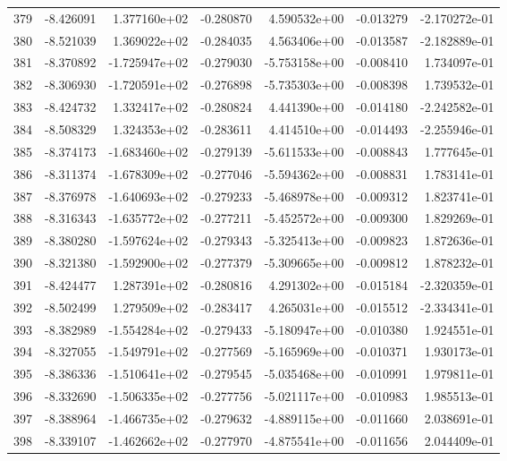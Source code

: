\begin{tabular}{rrrrrrr}
 379 &  -8.426091 &  1.377160e+02 & -0.280870 &  4.590532e+00 &   -0.013279 & -2.170272e-01 \\
 380 &  -8.521039 &  1.369022e+02 & -0.284035 &  4.563406e+00 &   -0.013587 & -2.182889e-01 \\
 381 &  -8.370892 & -1.725947e+02 & -0.279030 & -5.753158e+00 &   -0.008410 &  1.734097e-01 \\
 382 &  -8.306930 & -1.720591e+02 & -0.276898 & -5.735303e+00 &   -0.008398 &  1.739532e-01 \\
 383 &  -8.424732 &  1.332417e+02 & -0.280824 &  4.441390e+00 &   -0.014180 & -2.242582e-01 \\
 384 &  -8.508329 &  1.324353e+02 & -0.283611 &  4.414510e+00 &   -0.014493 & -2.255946e-01 \\
 385 &  -8.374173 & -1.683460e+02 & -0.279139 & -5.611533e+00 &   -0.008843 &  1.777645e-01 \\
 386 &  -8.311374 & -1.678309e+02 & -0.277046 & -5.594362e+00 &   -0.008831 &  1.783141e-01 \\
 387 &  -8.376978 & -1.640693e+02 & -0.279233 & -5.468978e+00 &   -0.009312 &  1.823741e-01 \\
 388 &  -8.316343 & -1.635772e+02 & -0.277211 & -5.452572e+00 &   -0.009300 &  1.829269e-01 \\
 389 &  -8.380280 & -1.597624e+02 & -0.279343 & -5.325413e+00 &   -0.009823 &  1.872636e-01 \\
 390 &  -8.321380 & -1.592900e+02 & -0.277379 & -5.309665e+00 &   -0.009812 &  1.878232e-01 \\
 391 &  -8.424477 &  1.287391e+02 & -0.280816 &  4.291302e+00 &   -0.015184 & -2.320359e-01 \\
 392 &  -8.502499 &  1.279509e+02 & -0.283417 &  4.265031e+00 &   -0.015512 & -2.334341e-01 \\
 393 &  -8.382989 & -1.554284e+02 & -0.279433 & -5.180947e+00 &   -0.010380 &  1.924551e-01 \\
 394 &  -8.327055 & -1.549791e+02 & -0.277569 & -5.165969e+00 &   -0.010371 &  1.930173e-01 \\
 395 &  -8.386336 & -1.510641e+02 & -0.279545 & -5.035468e+00 &   -0.010991 &  1.979811e-01 \\
 396 &  -8.332690 & -1.506335e+02 & -0.277756 & -5.021117e+00 &   -0.010983 &  1.985513e-01 \\
 397 &  -8.388964 & -1.466735e+02 & -0.279632 & -4.889115e+00 &   -0.011660 &  2.038691e-01 \\
 398 &  -8.339107 & -1.462662e+02 & -0.277970 & -4.875541e+00 &   -0.011656 &  2.044409e-01 \\

\end{tabular}
